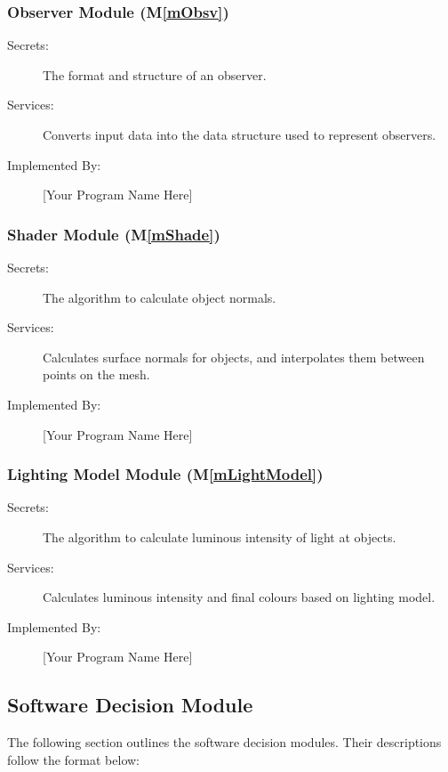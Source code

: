 \documentclass[12pt, titlepage]{article}
\newcommand{\mref}[1]{M\ref{#1}}
\begin{document}
\subsubsection{Observer Module (\mref{mObsv})}

\begin{description}
	\item[Secrets:]The format and structure of an observer.
	\item[Services:]Converts input data into the data structure used to 
	represent observers.
	\item[Implemented By:] [Your Program Name Here]
\end{description}

\subsubsection{Shader Module (\mref{mShade})}

\begin{description}
	\item[Secrets:]The algorithm to calculate object normals.
	\item[Services:]Calculates surface normals for objects, and interpolates 
	them between points on the mesh.
	\item[Implemented By:] [Your Program Name Here]
\end{description}

\subsubsection{Lighting Model Module (\mref{mLightModel})}

\begin{description}
	\item[Secrets:]The algorithm to calculate luminous intensity of light at 
	objects.
	\item[Services:]Calculates luminous intensity and final colours based on 
	lighting model.
	\item[Implemented By:] [Your Program Name Here]
\end{description}

\subsection{Software Decision Module}
The following section outlines the software decision modules. Their 
descriptions follow the format below: 
\end{document}
